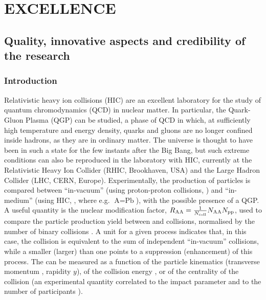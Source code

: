 \documentclass[a4paper,11pt]{article}
\begin{document}
%     
% 

\section{EXCELLENCE} 
\label{sec:excellence}

%             

\subsection{Quality, innovative aspects and credibility of the research} %
\label{sec:quality}

\subsubsection{Introduction}

Relativistic heavy ion collisions (HIC) are an excellent laboratory for the study of quantum chromodynamics (QCD) in nuclear matter. In particular, the Quark-Gluon Plasma (QGP) can be studied, a phase of QCD in which, at sufficiently high temperature and energy density, quarks and gluons are no longer confined inside hadrons, as they are in ordinary matter. The universe is thought to have been in such a state for the few instants after the Big Bang, but such extreme conditions can also be reproduced in the laboratory with HIC, currently at the Relativistic Heavy Ion Collider (RHIC, Brookhaven, USA)
and the Large Hadron Collider (LHC, CERN, Europe).
%
Experimentally, the production of particles is compared between ``in-vacuum'' (using proton-proton collisions, \pp) and ``in-medium'' (using HIC, \AAA, where e.g. $\textrm{A} = \textrm{Pb}$), with the possible presence of a QGP. A useful quantity is the nuclear modification factor, $R_{\text{AA}} = \frac{1}{N_{\text{coll}}}{N_{\text{AA}}}{N_{{\text{pp}}}}$, used to compare the particle production yield between \pp and \AAA collisions, normalised by the number of binary collisions \ncoll. A unit \raa for a given process indicates that, in this case, the \AAA collision is equivalent to the sum of independent ``in-vacuum'' \pp collisions, while a \raa smaller (larger) than one points to a suppression (enhancement) of this process. The \raa can be measured as a function of the particle kinematics (transverse momentum \pt, rapidity $y$), of the collision energy \sqrtsnn, or of the centrality of the collision (an experimental quantity correlated to the impact parameter and to the number of participants \npart).
\end{document}
